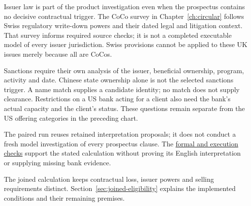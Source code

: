 \documentclass[12pt,a4paper,oneside,openany]{book}
\begin{document}
Issuer law is part of the product investigation even when the prospectus
contains no decisive contractual trigger. The CoCo survey in
Chapter~\ref{ch:circular} follows Swiss regulatory write-down powers and their
dated legal and litigation context. That survey informs required source checks;
it is not a completed executable model of every issuer jurisdiction. Swiss
provisions cannot be applied to these UK issues merely because all are CoCos.

Sanctions require their own analysis of the issuer, beneficial ownership,
program, activity and date. Chinese state ownership alone is not the selected
sanctions trigger. A name match supplies a candidate identity; no match does
not supply clearance. Restrictions on a US bank acting for a client also need
the bank's actual capacity and the client's status. These questions remain
separate from the US offering categories in the preceding chart.

The paired run reuses retained interpretation proposals; it does not conduct a
fresh model investigation of every prospectus clause. The
\hyperref[map:certificates]{formal and execution checks} support the stated
calculation without proving its English interpretation or supplying missing
bank evidence.

\clearpage
{}
The joined calculation keeps contractual loss, issuer powers and selling
requirements distinct. Section~\ref{sec:joined-eligibility} explains the
implemented conditions and their remaining premises.
\end{document}
